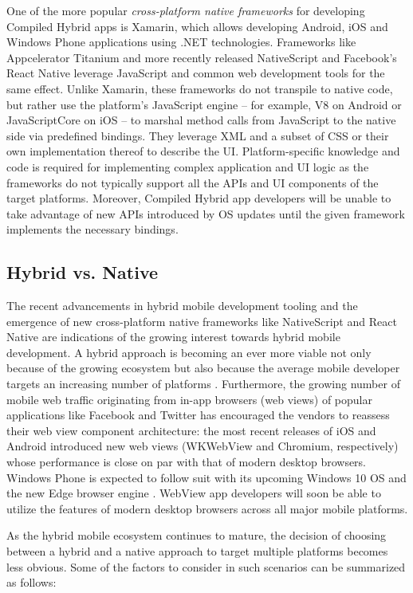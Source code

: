 \documentclass[thesis.tex]{subfiles}
\begin{document}
One of the more popular \textit{cross-platform native frameworks} for developing Compiled Hybrid apps is Xamarin, which allows developing Android, iOS and Windows Phone applications using .NET technologies. Frameworks like Appcelerator Titanium and more recently released NativeScript and Facebook's React Native leverage JavaScript and common web development tools for the same effect. Unlike Xamarin, these frameworks do not transpile to native code, but rather use the platform's JavaScript engine -- for example, V8 on Android or JavaScriptCore on iOS -- to marshal method calls from JavaScript to the native side via predefined bindings. They leverage XML and a subset of CSS or their own implementation thereof to describe the UI. Platform-specific knowledge and code is required for implementing complex application and UI logic as the frameworks do not typically support all the APIs and UI components of the target platforms. Moreover, Compiled Hybrid app developers will be unable to take advantage of new APIs introduced by OS updates until the given framework implements the necessary bindings.

\subsection{Hybrid vs. Native}

The recent advancements in hybrid mobile development tooling and the emergence of new cross-platform native frameworks like NativeScript and React Native are indications of the growing interest towards hybrid mobile development. A hybrid approach is becoming an ever more viable not only because of the growing ecosystem but also because the average mobile developer targets an increasing number of platforms \cite{two_platforms}. Furthermore, the growing number of mobile web traffic originating from in-app browsers (web views) of popular applications like Facebook and Twitter has encouraged the vendors to reassess their web view component architecture: the most recent releases of iOS and Android introduced new web views (WKWebView and Chromium, respectively) whose performance is close on par with that of modern desktop browsers. \cite{souders_webview} Windows Phone is expected to follow suit with its upcoming Windows 10 OS and the new Edge browser engine \cite{spartan}. WebView app developers will soon be able to utilize the features of modern desktop browsers across all major mobile platforms.

As the hybrid mobile ecosystem continues to mature, the decision of choosing between a hybrid and a native approach to target multiple platforms becomes less obvious. Some of the factors to consider in such scenarios can be summarized as follows:
\end{document}
